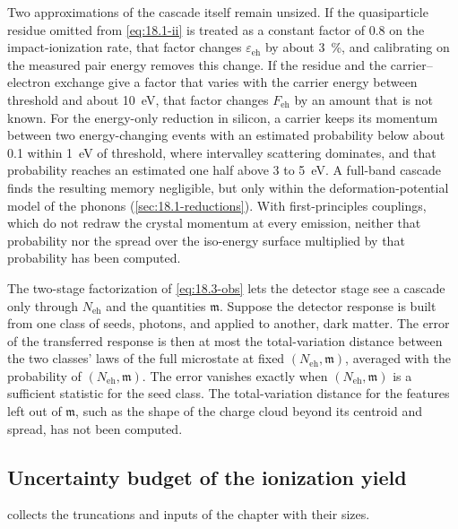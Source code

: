 Two approximations of the cascade itself remain unsized. If the quasiparticle residue omitted from \cref{eq:18.1-ii} is treated as a constant factor of 0.8 on the impact-ionization rate, that factor changes $\varepsilon_{\mathrm{eh}}$ by about \SI{3}{\percent}, and calibrating on the measured pair energy removes this change. If the residue and the carrier--electron exchange give a factor that varies with the carrier energy between threshold and about \SI{10}{eV}, that factor changes $F_{\mathrm{eh}}$ by an amount that is not known. For the energy-only reduction in silicon, a carrier keeps its momentum between two energy-changing events with an estimated probability below about 0.1 within \SI{1}{eV} of threshold, where intervalley scattering dominates, and that probability reaches an estimated one half above 3 to \SI{5}{eV}. A full-band cascade finds the resulting memory negligible, but only within the deformation-potential model of the phonons (\cref{sec:18.1-reductions}). With first-principles couplings, which do not redraw the crystal momentum at every emission, neither that probability nor the spread over the iso-energy surface multiplied by that probability has been computed.

The two-stage factorization of \cref{eq:18.3-obs} lets the detector stage see a cascade only through $N_{\mathrm{eh}}$ and the quantities $\mathfrak{m}$. Suppose the detector response is built from one class of seeds, photons, and applied to another, dark matter. The error of the transferred response is then at most the total-variation distance between the two classes' laws of the full microstate at fixed $(N_{\mathrm{eh}}, \mathfrak{m})$, averaged with the probability of $(N_{\mathrm{eh}}, \mathfrak{m})$. The error vanishes exactly when $(N_{\mathrm{eh}}, \mathfrak{m})$ is a sufficient statistic for the seed class. The total-variation distance for the features left out of $\mathfrak{m}$, such as the shape of the charge cloud beyond its centroid and spread, has not been computed.

\subsection{Uncertainty budget of the ionization yield}

 collects the truncations and inputs of the chapter with their sizes.

